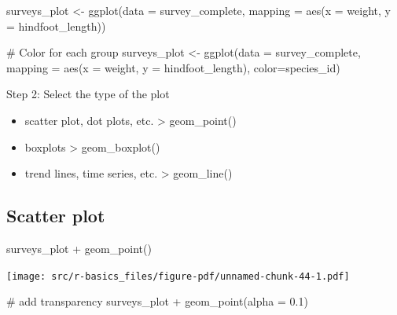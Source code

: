 \documentclass[
  letterpaper,
  DIV=11,
  numbers=noendperiod]{scrreprt}
\newenvironment{Shaded}{\begin{snugshade}}{\end{snugshade}}
\newcommand{\AttributeTok}[1]{\textcolor[rgb]{0.40,0.45,0.13}{#1}}
\newcommand{\CommentTok}[1]{\textcolor[rgb]{0.37,0.37,0.37}{#1}}
\newcommand{\FloatTok}[1]{\textcolor[rgb]{0.68,0.00,0.00}{#1}}
\newcommand{\FunctionTok}[1]{\textcolor[rgb]{0.28,0.35,0.67}{#1}}
\newcommand{\NormalTok}[1]{\textcolor[rgb]{0.00,0.23,0.31}{#1}}
\newcommand{\OtherTok}[1]{\textcolor[rgb]{0.00,0.23,0.31}{#1}}
\newcommand{\SpecialCharTok}[1]{\textcolor[rgb]{0.37,0.37,0.37}{#1}}
\providecommand{\tightlist}{%
  \setlength{\itemsep}{0pt}\setlength{\parskip}{0pt}}\usepackage{longtable,booktabs,array}
\begin{document}
\begin{Shaded}
\begin{Highlighting}[]
\NormalTok{surveys\_plot }\OtherTok{\textless{}{-}} \FunctionTok{ggplot}\NormalTok{(}\AttributeTok{data =}\NormalTok{ survey\_complete, }
    \AttributeTok{mapping =} \FunctionTok{aes}\NormalTok{(}\AttributeTok{x =}\NormalTok{ weight, }\AttributeTok{y =}\NormalTok{ hindfoot\_length))}

\CommentTok{\# Color for each group}
\NormalTok{surveys\_plot }\OtherTok{\textless{}{-}} \FunctionTok{ggplot}\NormalTok{(}\AttributeTok{data =}\NormalTok{ survey\_complete, }
    \AttributeTok{mapping =} \FunctionTok{aes}\NormalTok{(}\AttributeTok{x =}\NormalTok{ weight, }\AttributeTok{y =}\NormalTok{ hindfoot\_length),}
    \AttributeTok{color=}\NormalTok{species\_id)}
\end{Highlighting}
\end{Shaded}

Step 2: Select the type of the plot

\begin{itemize}
\tightlist
\item
  scatter plot, dot plots, etc. \textgreater{} geom\_point()
\item
  boxplots \textgreater{} geom\_boxplot()
\item
  trend lines, time series, etc. \textgreater{} geom\_line()
\end{itemize}

\subsection{Scatter plot}\label{scatter-plot}

\begin{Shaded}
\begin{Highlighting}[]
\NormalTok{surveys\_plot }\SpecialCharTok{+} \FunctionTok{geom\_point}\NormalTok{()}
\end{Highlighting}
\end{Shaded}

\texttt{[image: src/r-basics\_files/figure-pdf/unnamed-chunk-44-1.pdf]}

\begin{Shaded}
\begin{Highlighting}[]
\CommentTok{\# add transparency}
\NormalTok{surveys\_plot }\SpecialCharTok{+} \FunctionTok{geom\_point}\NormalTok{(}\AttributeTok{alpha =} \FloatTok{0.1}\NormalTok{)}
\end{Highlighting}
\end{Shaded}
\end{document}
